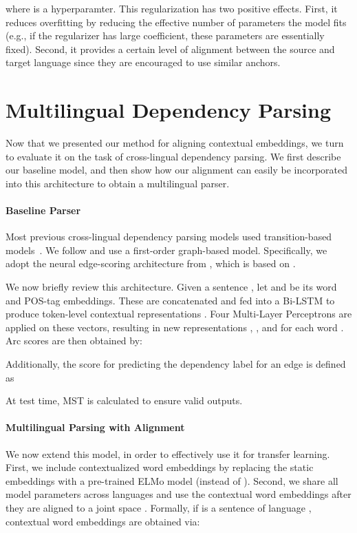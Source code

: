 \documentclass[11pt,a4paper]{article}
\newcommand{\comment}[1]{}
\begin{document}
where  is a hyperparamter. 
This regularization has two positive effects. First, 
it reduces overfitting by reducing the effective number of parameters the model fits (e.g., if the regularizer has large coefficient, these parameters are essentially fixed). Second, it provides a certain level of alignment between the source and target language since they are encouraged to use similar anchors.

 \section{Multilingual Dependency Parsing}\label{section:dependency_parsing}

Now that we presented our method for aligning contextual embeddings, we turn to evaluate it on the task of cross-lingual dependency parsing. We first describe our baseline model, and then show how our alignment can easily be incorporated into this architecture to obtain a multilingual parser.


 \paragraph{Baseline Parser} Most previous cross-lingual dependency parsing models used transition-based models~\cite{ammar_one_2016, guo_representation_2016}. We follow \citet{che_towards_2018, wang2018improved, clark2018semi} and use a first-order graph-based model. Specifically, we adopt the neural edge-scoring architecture from \citet{dozat_deep_2017, dozat_stanford_2018}, which is based on \citet{kiperwasser_simple_2016}.
\comment{
Formally, let  be a sentence with  words,  be the word embedding, and  be the POS-tag\footnote{We use only Universal POS tags.} embedding of the -th word in . The representation vector for each token is computed by:

}
We now briefly review this architecture. Given a sentence , let  and  be its word and POS-tag embeddings. These are concatenated and fed into a Bi-LSTM to produce token-level contextual representations .
 Four Multi-Layer Perceptrons are applied on these vectors, resulting in new representations , ,  and  for each word . Arc scores are then obtained by:

Additionally, the score for predicting the dependency label  for an edge  is defined as 

At test time, MST is calculated to ensure valid outputs. 
\paragraph{Multilingual Parsing with Alignment}
We now extend this model, in order to effectively use it for transfer learning. First, we include contextualized word embeddings by replacing the static embeddings with a pre-trained ELMo \cite{peters_deep_2018} model (instead of ). Second, we share all model parameters across languages and use the contextual word embeddings after they are aligned to a joint space . 
Formally, if  is a sentence of language , contextual word embeddings are obtained via:
\end{document}
